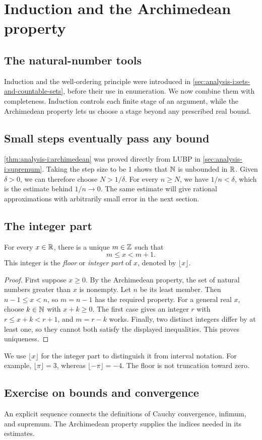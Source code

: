 \section{Induction and the Archimedean property}
\label{sec:analysis-i:mathematical-induction}
\label{sec:analysis-i:archimedean}

\subsection{The natural-number tools}
Induction and the well-ordering principle were introduced in
\autoref{sec:analysis-i:sets-and-countable-sets}, before their use in
enumeration. We now combine them with completeness. Induction controls
each finite stage of an argument, while the Archimedean property lets us
choose a stage beyond any prescribed real bound.

\subsection{Small steps eventually pass any bound}
\autoref{thm:analysis-i:archimedean} was proved directly from LUBP
in \autoref{sec:analysis-i:supremum}. Taking the step size to be $1$
shows that $\mathbb{N}$ is unbounded in $\mathbb{R}$. Given $\delta>0$, we can therefore
choose $N>1/\delta$. For every $n\geq N$, we have $1/n<\delta$, which
is the estimate behind $1/n\to0$. The same estimate will give rational
approximations with arbitrarily small error in the next section.

\subsection{The integer part}
\begin{proposition}
  For every $x\in\mathbb{R}$, there is a unique $m\in\mathbb{Z}$ such that
  \[
    m\leq x<m+1.
  \]
  This integer is the \emph{floor} or \emph{integer part} of $x$, denoted
  by $\lfloor x\rfloor$.
\end{proposition}
\begin{proof}
  First suppose $x\geq0$. By the Archimedean property, the set of natural
  numbers greater than $x$ is nonempty. Let $n$ be its least member.
  Then $n-1\leq x<n$, so $m=n-1$ has the required property. For a general
  real $x$, choose $k\in\mathbb{N}$ with $x+k\geq0$. The first case gives an
  integer $r$ with $r\leq x+k<r+1$, and $m=r-k$ works.
  Finally, two distinct integers differ by at least one, so they cannot
  both satisfy the displayed inequalities. This proves uniqueness.
\end{proof}
We use $\lfloor x\rfloor$ for the integer part to distinguish it from
interval notation. For example, $\lfloor\pi\rfloor=3$,
whereas $\lfloor-\pi\rfloor=-4$. The floor is not truncation toward zero.

\subsection{Exercise on bounds and convergence}
An explicit sequence connects the definitions of Cauchy convergence,
infimum, and supremum. The Archimedean property supplies the indices
needed in its estimates.



